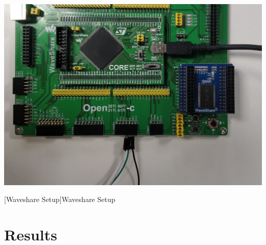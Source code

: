 \documentclass[%
xelatex,
	oneside,		%
	12pt,			%
	parskip=half,	%
	abstracton,
	chapterprefix=true%
    appendixprefix=true]
{scrbook}
\begin{document}
\begin{center}
\includegraphics[scale=0.15,angle=180]{fig/waveshare.jpg}

[Waveshare Setup]{Waveshare Setup}
\label{fig:wavesharesetup}
\end{center}
		\chapter{Results}
			
\rofoot[\pagemark]{\pagemark}
		
\end{document}
